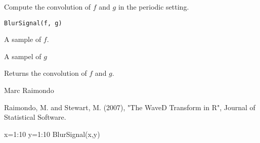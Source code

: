 \documentclass{article}
\begin{document}
\begin{Description}\relax
Compute the convolution of $f$ and $g$ in the periodic setting.
\end{Description}
\begin{Usage}
\begin{verbatim}
BlurSignal(f, g)
\end{verbatim}
\end{Usage}
\begin{Arguments}
\begin{ldescription}
\item[\code{f}] A sample of $f$.
\item[\code{g}] A sampel of $g$ 
\end{ldescription}
\end{Arguments}
\begin{Value}
Returns the convolution of $f$ and $g$.
\end{Value}
\begin{Author}\relax
Marc Raimondo
\end{Author}
\begin{References}\relax
Raimondo, M. and Stewart, M. (2007),
"The WaveD Transform in R", Journal of Statistical Software.
\end{References}
\begin{SeeAlso}\relax
{}
\end{SeeAlso}
\begin{Examples}
\begin{ExampleCode} 
x=1:10
y=1:10 
BlurSignal(x,y)

\end{ExampleCode}
\end{Examples}
\end{document}
